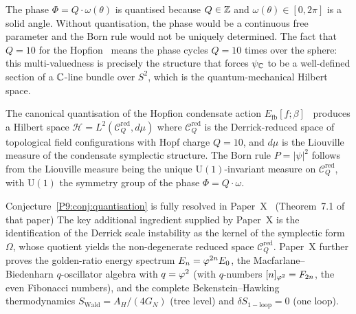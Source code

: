 \begin{remark}
\label{P9:rem:role_of_Q}
The phase $\Phi = Q\cdot\omega(\theta)$ is quantised because $Q\in\mathbb{Z}$
and $\omega(\theta)\in[0,2\pi]$ is a solid angle.
Without quantisation, the phase would be a continuous free parameter and
the Born rule would not be uniquely determined.
The fact that $Q=10$ for the Hopfion~\cite{Paper1} means
the phase cycles $Q=10$ times over the sphere: this multi-valuedness
is precisely the structure that forces $\psi_{\mathbb{C}}$ to be a well-defined
section of a $\mathbb{C}$-line bundle over $S^2$, which is the quantum-mechanical
Hilbert space.
\end{remark}

\begin{conjecture}
\label{P9:conj:quantisation}
The canonical quantisation of the Hopfion condensate action
$E_\mathrm{fb}[f;\beta]$~\cite{Paper6,Paper7} produces a
Hilbert space $\mathcal{H}=L^2(\mathcal{C}_Q^\mathrm{red},d\mu)$ where
$\mathcal{C}_Q^\mathrm{red}$ is the Derrick-reduced space of topological
field configurations with Hopf charge $Q=10$, and $d\mu$ is the Liouville
measure of the condensate symplectic structure.
The Born rule $P=|\psi|^2$ follows from the Liouville measure being
the unique $\mathrm{U}(1)$-invariant measure on $\mathcal{C}_Q^\mathrm{red}$,
with $\mathrm{U}(1)$ the symmetry group of the phase $\Phi = Q\cdot\omega$.
\end{conjecture}

\begin{remark}
\label{P9:rem:conj_resolved}
Conjecture~\ref{P9:conj:quantisation} is fully resolved in
Paper~X~\cite{Paper10} (Theorem~7.1 of that paper)
The key additional ingredient supplied by Paper~X is the identification
of the Derrick scale instability as the kernel of the symplectic form
$\Omega$, whose quotient yields the non-degenerate reduced space
$\mathcal{C}_Q^\mathrm{red}$.
Paper~X further proves the golden-ratio energy spectrum
$E_n = \varphi^{2n}E_0$, the Macfarlane--Biedenharn $q$-oscillator algebra
with $q=\varphi^2$ (with $q$-numbers $[n]_{\varphi^2}=F_{2n}$, the even Fibonacci
numbers), and the complete Bekenstein--Hawking thermodynamics
$S_\mathrm{Wald}=A_H/(4G_N)$ (tree level) and $\delta S_\mathrm{1-loop}=0$
(one loop).
\end{remark}

